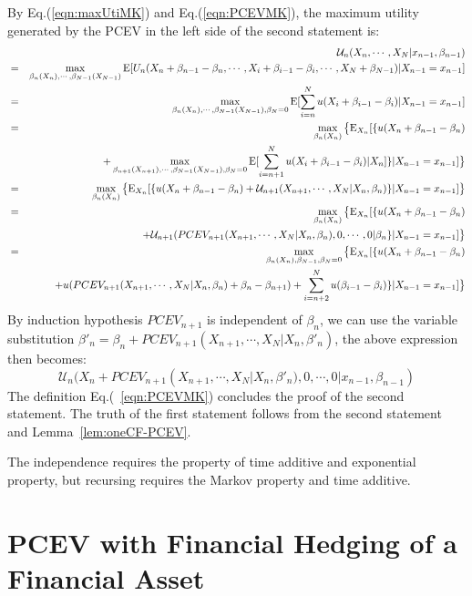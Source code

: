 \documentclass{article}[12pt letter]
\newcommand{\E}{\mathrm{E}}
\begin{document}
By Eq.(\ref{eqn:maxUtiMK}) and Eq.(\ref{eqn:PCEVMK}), the maximum utility generated by the PCEV in the left side of the second statement is:
\begin{eqnarray*}
    &&\mathcal{U}_n(X_n,\cdots, X_{N}|x_{n-1},\beta_{n-1}) \nonumber \\
    & =& \max_{\beta_n(X_n), \cdots, \beta_{N-1}(X_{N-1})} \E [U_n(X_n+\beta_{n-1}-\beta_n, \cdots, X_i + \beta_{i-1}-\beta_i, \cdots, X_N + \beta_{N-1})|X_{n-1}=x_{n-1} ]\\
    &=&\max_{\beta_n(X_n), \cdots, \beta_{N-1}(X_{N-1}), \beta_N=0} \E [\sum_{i=n}^Nu(X_i + \beta_{i-1}-\beta_i)|X_{n-1}=x_{n-1}] \\
    &=& \max_{\beta_n(X_n)} \big{\{}\E_{X_n} [ \{u(X_n + \beta_{n-1} - \beta_{n})\\ && +\max_{\beta_{n+1}(X_{n+1}),  \cdots, \beta_{N-1}(X_{N-1}), \beta_N=0}\E [\sum_{i=n+1}^Nu(X_i + \beta_{i-1}-\beta_i)|X_{n}]\}|X_{n-1}=x_{n-1}]\big{\}} \\
    &=& \max_{\beta_n(X_n)} \big{\{}\E_{X_n} [ \{u(X_n + \beta_{n-1} - \beta_{n}) + \mathcal{U}_{n+1}(X_{n+1},\cdots, X_N|X_n,\beta_n)\}|X_{n-1}=x_{n-1}]\big{\}} \\
    &=&  \max_{\beta_n(X_n)} \big{\{}\E_{X_n} [ \{u(X_n + \beta_{n-1} - \beta_{n})\\
    &&  + \mathcal{U}_{n+1}(PCEV_{n+1}(X_{n+1},\cdots, X_N|X_n,\beta_n),0,\cdots,0|\beta_n\}|X_{n-1}=x_{n-1}]\big{\}}\\
    &=& \max_{\beta_n(X_n), \beta_{N-1},\beta_N=0 } \big{\{}\E_{X_n} [ \{u(X_n + \beta_{n-1} - \beta_{n})  \\
&& + u(PCEV_{n+1}(X_{n+1},\cdots, X_N|X_n,\beta_n) + \beta_n-\beta_{n+1})
+\sum_{i=n+2}^N u(\beta_{i-1}-\beta_i)\}|X_{n-1}=x_{n-1}]\big{\}}
\end{eqnarray*}
By induction hypothesis $PCEV_{n+1}$ is independent of $\beta_n$, we can use the variable substitution $\beta'_n = \beta_n + PCEV_{n+1}(X_{n+1},\cdots, X_N|X_n,\beta'_n)$, the above expression then becomes:
\[ \mathcal{U}_n(X_n + PCEV_{n+1}(X_{n+1},\cdots,X_N|X_n,\beta'_n), 0, \cdots, 0|x_{n-1},\beta_{n-1}) \]
The definition Eq.(~\ref{eqn:PCEVMK}) concludes the proof of the second statement. The truth of the first statement follows from the second statement and Lemma~\ref{lem:oneCF-PCEV}.
\endproof

The independence requires the property of time additive and exponential property, but recursing requires the Markov property and time additive.

\section{PCEV with Financial Hedging of a Financial Asset}
\end{document}
